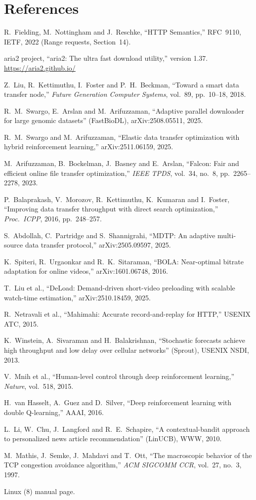 \chapter{References}\label{app:refs}
\begingroup\small
\begin{enumerate}[label={[\arabic*]},leftmargin=*]
\item R.~Fielding, M.~Nottingham and J.~Reschke, ``HTTP Semantics,'' RFC~9110, IETF, 2022 (Range requests, Section~14).
\item aria2 project, ``aria2: The ultra fast download utility,'' version 1.37. \url{https://aria2.github.io/}
\item Z.~Liu, R.~Kettimuthu, I.~Foster and P.~H.~Beckman, ``Toward a smart data transfer node,'' \emph{Future Generation Computer Systems}, vol.~89, pp.~10--18, 2018.
\item R.~M.~Swargo, E.~Arslan and M.~Arifuzzaman, ``Adaptive parallel downloader for large genomic datasets'' (FastBioDL), arXiv:2508.05511, 2025.
\item R.~M.~Swargo and M.~Arifuzzaman, ``Elastic data transfer optimization with hybrid reinforcement learning,'' arXiv:2511.06159, 2025.
\item M.~Arifuzzaman, B.~Bockelman, J.~Basney and E.~Arslan, ``Falcon: Fair and efficient online file transfer optimization,'' \emph{IEEE TPDS}, vol.~34, no.~8, pp.~2265--2278, 2023.
\item P.~Balaprakash, V.~Morozov, R.~Kettimuthu, K.~Kumaran and I.~Foster, ``Improving data transfer throughput with direct search optimization,'' \emph{Proc.\ ICPP}, 2016, pp.~248--257.
\item S.~Abdollah, C.~Partridge and S.~Shannigrahi, ``MDTP: An adaptive multi-source data transfer protocol,'' arXiv:2505.09597, 2025.
\item K.~Spiteri, R.~Urgaonkar and R.~K.~Sitaraman, ``BOLA: Near-optimal bitrate adaptation for online videos,'' arXiv:1601.06748, 2016.
\item T.~Liu et al., ``DeLoad: Demand-driven short-video preloading with scalable watch-time estimation,'' arXiv:2510.18459, 2025.
\item R.~Netravali et al., ``Mahimahi: Accurate record-and-replay for HTTP,'' USENIX ATC, 2015.
\item K.~Winstein, A.~Sivaraman and H.~Balakrishnan, ``Stochastic forecasts achieve high throughput and low delay over cellular networks'' (Sprout), USENIX NSDI, 2013.
\item V.~Mnih et al., ``Human-level control through deep reinforcement learning,'' \emph{Nature}, vol.~518, 2015.
\item H.~van Hasselt, A.~Guez and D.~Silver, ``Deep reinforcement learning with double Q-learning,'' AAAI, 2016.
\item L.~Li, W.~Chu, J.~Langford and R.~E.~Schapire, ``A contextual-bandit approach to personalized news article recommendation'' (LinUCB), WWW, 2010.
\item M.~Mathis, J.~Semke, J.~Mahdavi and T.~Ott, ``The macroscopic behavior of the TCP congestion avoidance algorithm,'' \emph{ACM SIGCOMM CCR}, vol.~27, no.~3, 1997.
\item Linux (8) manual page.
\end{enumerate}
